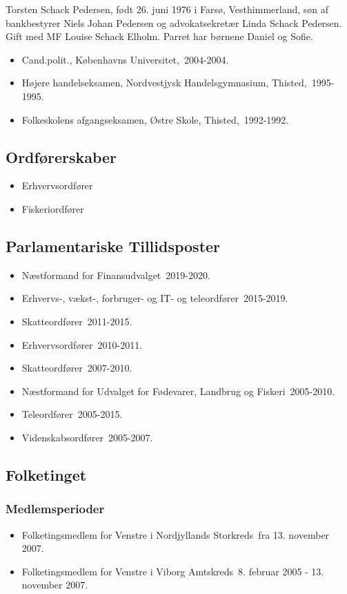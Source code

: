 \documentclass[11pt, a4paper]{awesome-cv}
\begin{document}
\makecvheader[R]
\makelettertitle
\begin{cvletter}
Torsten Schack  Pedersen, født 26. juni 1976 i Farsø, Vesthimmerland, søn af bankbestyrer Niels Johan Pedersen og advokatsekretær Linda Schack Pedersen. Gift med MF Louise Schack Elholm. Parret har børnene Daniel og Sofie.

\begin{itemize}
\item Cand.polit., Københavns Universitet, 2004-2004.
\item Højere handelseksamen, Nordvestjysk Handelsgymnasium, Thisted, 1995-1995.
\item Folkeskolens afgangseksamen, Østre Skole, Thisted, 1992-1992.
\end{itemize}
\subsection*{Ordførerskaber}
\begin{itemize}
\item Erhvervsordfører
\item Fiskeriordfører
\end{itemize}
\subsection*{Parlamentariske Tillidsposter}
\begin{itemize}
\item Næstformand for Finansudvalget 2019-2020.
\item Erhvervs-, vækst-, forbruger- og IT- og teleordfører 2015-2019.
\item Skatteordfører 2011-2015.
\item Erhvervsordfører 2010-2011.
\item Skatteordfører 2007-2010.
\item Næstformand for Udvalget for Fødevarer, Landbrug og Fiskeri 2005-2010.
\item Teleordfører 2005-2015.
\item Videnskabsordfører 2005-2007.
\end{itemize}
\subsection*{Folketinget}
\subsubsection*{Medlemsperioder}
\begin{itemize}
\item Folketingsmedlem for Venstre i Nordjyllands Storkreds fra 13. november 2007.
\item Folketingsmedlem for Venstre i Viborg Amtskreds 8. februar 2005 - 13. november 2007.
\end{itemize}

\end{cvletter}
\end{document}
